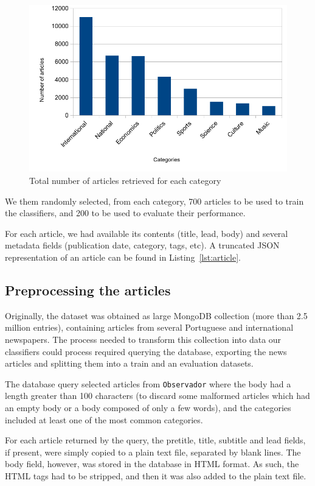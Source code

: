 \documentclass[conference]{IEEEtran}
\begin{document}
\begin{figure}[htbp]
\centerline{\includegraphics[width=.97\columnwidth]{imgs/articles}}
\caption{Total number of articles retrieved for each category}
\label{fig:articles}
\end{figure}

We them randomly selected, from each category, 700 articles to be used
to train the classifiers, and 200 to be used to evaluate their
performance.

For each article, we had available its contents (title, lead, body)
and several metadata fields (publication date, category, tags, etc). A
truncated JSON representation of an article can be found in
Listing~\ref{lst:article}.


\subsection{Preprocessing the articles}
\label{sec:preproc}

Originally, the dataset was obtained as large MongoDB collection (more
than 2.5 million entries), containing articles from several Portuguese
and international newspapers. The process needed to transform this
collection into data our classifiers could process required querying
the database, exporting the news articles and splitting them into a
train and an evaluation datasets.

The database query selected articles from \texttt{Observador} where
the body had a length greater than 100 characters (to
discard some malformed articles which had an empty body or a body
composed of only a few words), and the categories included at least
one of the most common categories.

For each article returned by the query, the pretitle, title, subtitle
and lead fields, if present, were simply copied to a plain text file,
separated by blank lines. The body field, however, was stored in the
database in HTML format. As such, the HTML tags had to be stripped,
and then it was also added to the plain text file.
\end{document}
